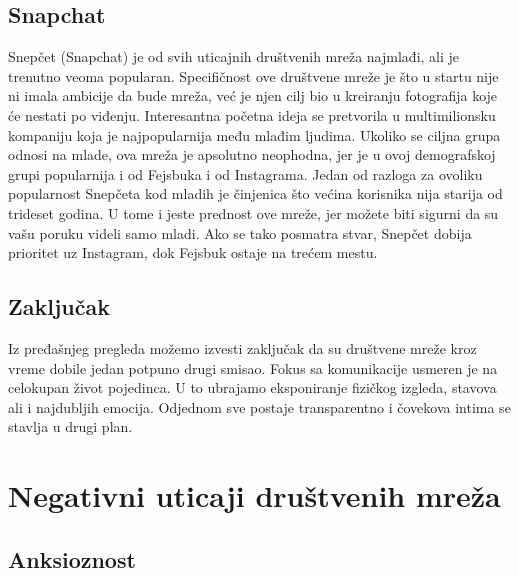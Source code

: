 \documentclass[a4paper]{article}
\begin{document}
{		\subsection{Snapchat}
		\label{subsec:podnaslov4}
		Snepčet (Snapchat) je od svih uticajnih društvenih mreža najmlađi, ali je trenutno veoma popularan. Specifičnost ove društvene mreže je što u startu nije ni imala ambicije da bude mreža, već je njen cilj bio u kreiranju fotografija koje će nestati po viđenju. Interesantna početna ideja se pretvorila u multimilionsku kompaniju koja je najpopularnija među mlađim ljudima. Ukoliko se ciljna grupa odnosi na mlade, ova mreža je apsolutno neophodna, jer je u ovoj demografskoj grupi popularnija i od Fejsbuka i od Instagrama. Jedan od razloga za ovoliku popularnost Snepčeta kod mladih je činjenica što većina korisnika nija starija od trideset godina. U tome i jeste prednost ove mreže, jer možete biti sigurni da su vašu poruku videli samo mladi. Ako se tako posmatra stvar, Snepčet dobija prioritet uz Instagram, dok Fejsbuk ostaje na trećem mestu.
		\subsection{Zaključak}
		\label{subsec:podnaslov5}
		Iz pređašnjeg pregleda možemo izvesti zaključak da su društvene mreže kroz vreme dobile jedan potpuno drugi smisao. Fokus sa komunikacije usmeren je na celokupan život pojedinca. U to ubrajamo eksponiranje fizičkog izgleda, stavova ali i najdubljih emocija. Odjednom sve postaje transparentno i čovekova intima se stavlja u drugi plan.
		
		
		\section{Negativni uticaji društvenih mreža}	
		\label{sec:termini_i_citiranje}
		\subsection{Anksioznost}
		\label{subsec:podnaslov4}
		
}
\end{document}
